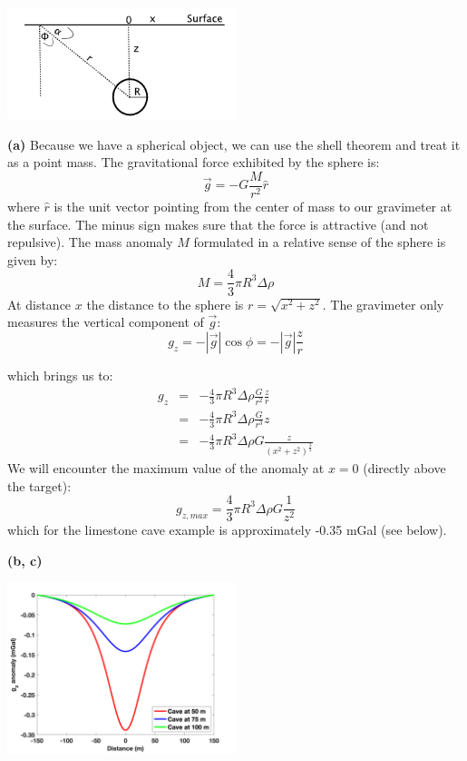 \documentclass[a4paper,12pt]{article}
\newif\ifanswers
\begin{document}
\ifanswers
    \begin{tcolorbox}[enhanced jigsaw,breakable,pad at break*=1mm,
    colback=blue!5!white,colframe=babyblueeyes,title=Solutions]
     \begin{center}
       \includegraphics[width=0.5\textwidth]{Figures/Gravimetry/Gravimetry01_SphereSketchSolutions.png}
    \end{center}
    \textbf{(a)} Because we have a spherical object, we can use the shell theorem and treat it as a point mass. The gravitational force exhibited by the sphere is:
    $$
    \vec{g} = -G\frac{M}{r^2}\hat{r}
    $$
    where $\hat{r}$ is the unit vector pointing from the center of mass to our gravimeter at the surface. The minus sign makes sure that the force is attractive (and not repulsive). The mass anomaly $M$ formulated in a relative sense of the sphere is given by:
    $$
    M = \frac{4}{3}\pi R^3 \Delta \rho
    $$
    At distance $x$ the distance to the sphere is $r=\sqrt{x^2+z^2}$. The gravimeter only measures the vertical component of $\vec{g}$:
    $$
    g_z = -|\vec{g}|\cos\phi = -|\vec{g}|\frac{z}{r}
    $$
  
    which brings us to:
    \begin{eqnarray*}
    g_z &=& -\frac{4}{3}\pi R^3 \Delta \rho \frac{G}{r^2} \frac{z}{r} \\
        &=& -\frac{4}{3}\pi R^3 \Delta \rho \frac{G}{r^3} z \\
        &=& -\frac{4}{3}\pi R^3 \Delta \rho G \frac{z}{(x^2+z^2)^\frac{3}{2}}
    \end{eqnarray*}
    We will encounter the maximum value of the anomaly at $x = 0$ (directly above the target):
    $$
    g_{z,max} = \frac{4}{3}\pi R^3 \Delta \rho G \frac{1}{z^2}
    $$
    which for the limestone cave example is approximately -0.35 mGal (see below).
    

    \textbf{(b, c)}
    
    \begin{center}
        \includegraphics[width=0.5\textwidth]{Figures/Gravimetry/Gravimetry01_Visualization.png}
    \end{center}
 

\end{tcolorbox}
\end{document}
